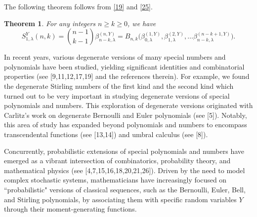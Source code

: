 \documentclass[a4paper,11pt]{amsart}
\newtheorem{theorem}{Theorem}[section]
\begin{document}
The following theorem follows from \eqref{19} and \eqref{25}.
\begin{theorem}
For any integers $n \ge k \ge 0$, we have
\begin{equation*}
S_{1,\lambda}^{Y}(n,k)=\binom{n-1}{k-1}\beta_{n-k,\lambda}^{(n,Y)}=B_{n,k}\Big(\beta_{0,\lambda}^{(1,Y)},\beta_{1,\lambda}^{(2,Y)}, \dots \beta_{n-k,\lambda}^{(n-k+1,Y)} \Big).
\end{equation*}
\end{theorem}
In recent years, various degenerate versions of many special numbers and polynomials have been studied, yielding significant identities and combinatorial properties (see [9,11,12,17,19] and the references therein). 
For example, we found the degenerate Stirling numbers of the first kind and the second kind which turned out to be very important in studying degenerate versions of special polynomials and numbers. This exploration of degenerate versions originated with Carlitz's work on degenerate Bernoulli and Euler polynomials (see [5]). Notably, this area of study has expanded beyond polynomials and numbers to encompass transcendental functions (see [13,14]) and umbral calculus (see [8]). \par
Concurrently, probabilistic extensions of special polynomials and numbers have emerged as a vibrant intersection of combinatorics, probability theory, and mathematical physics (see [4,7,15,16,18,20,21,26]). Driven by the need to model complex stochastic systems, mathematicians have increasingly focused on ``probabilistic" versions of classical sequences, such as the Bernoulli, Euler, Bell, and Stirling polynomials, by associating them with specific random variables $Y$ through their moment-generating functions. \par
\end{document}
